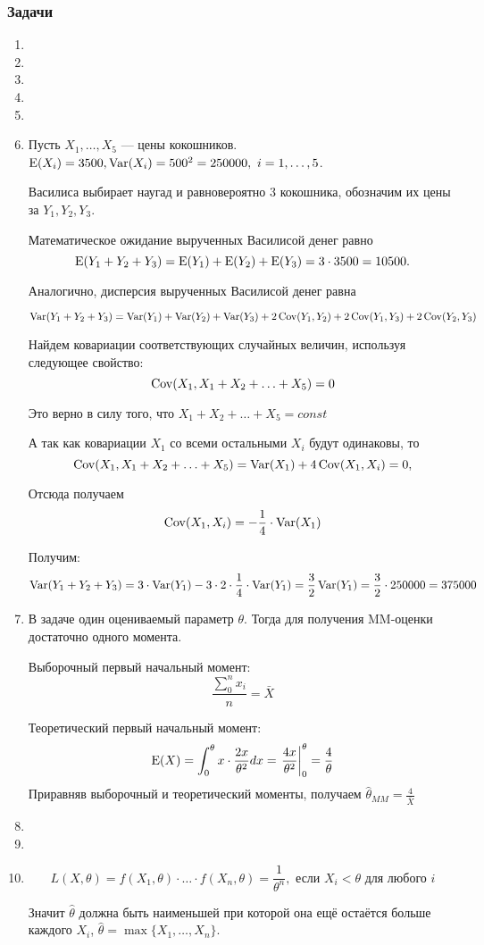 \subsubsection*{Задачи}
\begin{enumerate}
	
  \item
  \item
  \item
  \item
  \item
	\item 
	Пусть $X_1, \ldots, X_5$ — цены кокошников. $\operatorname{E} (X_i) = 3500, \operatorname{Var} (X_i) = 500^2 = 250000, \ i = 1, \ldots, 5$.

 Василиса выбирает наугад и равновероятно 3 кокошника, обозначим их цены за $Y_1, Y_2, Y_3$.

Математическое ожидание вырученных Василисой денег равно  
\[ 
\operatorname{E} (Y_1 + Y_2 + Y_3) = 
\operatorname{E} (Y_1)  + \operatorname{E} (Y_2) + \operatorname{E} (Y_3) = 3 \cdot 3500 = 10500.
\] 

 Аналогично, дисперсия вырученных Василисой денег равна

\[ 
\operatorname{Var} (Y_1 + Y_2 + Y_3) = \operatorname{Var} (Y_1) + \operatorname{Var} (Y_2) + \operatorname{Var} (Y_3) + 2 \operatorname{Cov} (Y_1, Y_2) + 2 \operatorname{Cov} (Y_1, Y_3) + 2 \operatorname{Cov} (Y_2, Y_3)
\]

 Найдем ковариации соответствующих случайных величин, используя следующее свойство: 
 \[ \operatorname{Cov} (X_1, X_1 + X_2 + \ldots + X_5) = 0\]

  Это верно в силу того, что $X_1 + X_2 + \ldots + X_5 = const $

 А так как ковариации $X_1$ со всеми остальными $X_i$ будут одинаковы, то 
\[  \operatorname{Cov} (X_1, X_1 + X_2 + \ldots + X_5) = \operatorname{Var} (X_1) + 4 \operatorname{Cov} (X_1, X_i) = 0, \] 

 Отсюда получаем 
\[ \operatorname{Cov} (X_1, X_i) = - \frac{1}{4} \cdot \operatorname{Var} (X_1) \]
 
Получим: 
\[
 \operatorname{Var} (Y_1 + Y_2 + Y_3) = 3 \cdot \operatorname{Var} (Y_1) - 3 \cdot 2 \cdot \frac{1}{4} \cdot \operatorname{Var} (Y_1) 
  = \frac{3}{2}  \operatorname{Var} (Y_1) = \frac{3}{2} \cdot 250000 = 375000 
 \]
\item
В задаче один оцениваемый параметр $\theta$. Тогда для получения MM-оценки достаточно одного момента.

Выборочный первый начальный момент:
\[
\frac{\sum_{0}^{n}{x_{i}}}{n} = \bar X
\]

Теоретический первый начальный момент: 
\[
\operatorname{E} (X) = \int_{0}^{\theta} x \cdot \frac{2x}{\theta^{2}} dx = \left. \frac{4x}{\theta^{2}} \right|_{0}^{\theta} = \frac{4}{\theta}
\]
Приравняв выборочный и теоретический моменты, получаем $\hat \theta_{MM}=\frac{4}{\bar X}$
\item
\item

\item

\[
L(X, \theta)  = f(X_1, \theta) \cdot \ldots \cdot f(X_n, \theta) = \frac{1}{\theta^n}, \text{ если } X_i < \theta \text{ для любого } i 
\]

Значит $\hat{\theta}$ должна быть наименьшей при которой она ещё остаётся больше каждого $X_i$, $\hat{\theta} = \max\{X_1, \ldots, X_n\}$.

\end{enumerate}


